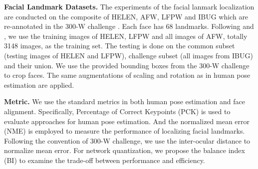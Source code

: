 {\bf Facial Landmark Datasets.} The experiments of the facial lanmark localization are conducted on the composite of HELEN, AFW, LFPW and IBUG which are re-annotated in the 300-W challenge \cite{sagonas2013300}. Each face has 68 landmarks. Following \cite{zhu2015face} and \cite{lv2017deep}, we use the training images of HELEN, LFPW and all images of AFW, totally 3148 images, as the training set. The testing is done on the common subset (testing images of HELEN and LFPW), challenge subset (all images from IBUG) and their union. We use the provided bounding boxes from the 300-W challenge to crop faces. The same augmentations of scaling and rotation as in human pose estimation are applied.

{\bf Metric.} We use the standard metrics in both human pose estimation and face alignment. Specifically, Percentage of Correct Keypoints (PCK) is used to evaluate approaches for human pose estimation. And the normalized mean error (NME) is employed to measure the performance of localizing facial landmarks. Following the convention of 300-W challenge, we use the inter-ocular distance to normalize mean error. For network quantization, we propose the balance index (BI) to examine the trade-off between performance and efficiency.


